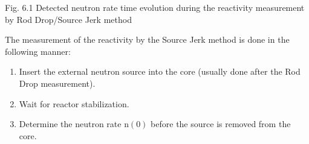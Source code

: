 \documentclass[10pt]{article}
\begin{document}
Fig. 6.1 Detected neutron rate time evolution during the reactivity measurement by Rod Drop/Source Jerk method

The measurement of the reactivity by the Source Jerk method is done in the following manner:

\begin{enumerate}
  \item Insert the external neutron source into the core (usually done after the Rod Drop measurement).

  \item Wait for reactor stabilization.

  \item Determine the neutron rate $\mathrm{n}(0)$ before the source is removed from the core.

\end{enumerate}
\end{document}
